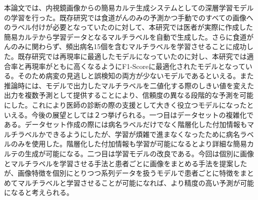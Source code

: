 本論文では、内視鏡画像からの簡易カルテ生成システムとしての深層学習モデルの学習を行った。既存研究では食道がんのみの予測かつ手動でのすべての画像へのラベル付けが必要となっていたのに対して、本研究では医者が実際に作成した簡易カルテから学習データとなるマルチラベルを自動で生成した。さらに食道がんのみに関わらず、頻出病名15個を含むマルチラベルを学習させることに成功した。既存研究では再現率に最適したモデルになっていたのに対し、本研究では適合率と再現率がともに高くなるようにF1-Scoreに最適化されたモデルとなっている。そのため病変の見逃しと誤検知の両方が少ないモデルであるといえる。また推論時には、モデルで出力したマルチラベルを二値化する際のしきい値を変えた出力を複数予測として提供することにより、信頼度の異なる段階的な予測を可能にした。これにより医師の診断の際の支援として大きく役立つモデルになったといえる。今後の展望としては２つ挙げられる。一つ目はデータセットの複雑化である。データセット作成の際には病名ラベルだけでなく階層化した付加情報もマルチラベルかできるようにしたが、学習が煩雑で進まなくなったために病名ラベルのみを使用した。階層化した付加情報も学習が可能になるとより詳細な簡易カルテの生成が可能になる。二つ目は学習モデルの改良である。今回は個別に画像とマルチラベルを学習させる手法と患者ごとに画像をまとめる手法を提案したが、画像特徴を個別にとりつつ系列データを扱うモデルで患者ごとに特徴をまとめてマルチラベルと学習させることが可能になれば、より精度の高い予測が可能になると考えられる。
